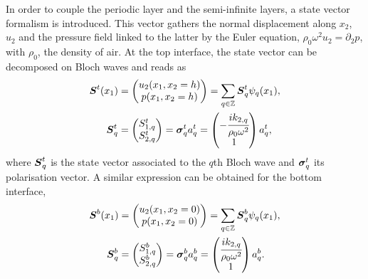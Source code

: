 In order to couple the periodic layer and the semi-infinite layers, a state vector formalism is introduced. This vector gathers  the normal displacement along $x_2$, $u_2$ and the pressure field linked to the latter by the Euler equation, $\rho_0\omega^2 u_2 = \partial_2 p$, with $\rho_0$, the density of air. At the top interface, the state vector can be decomposed on Bloch waves and reads as
\begin{equation}\label{eq:S^top}
    \begin{aligned}
        \boldsymbol S^t(x_1) &=
        \begin{pmatrix} u_2(x_1,x_2=h) \\ p(x_1,x_2=h) \end{pmatrix}
        = \sum_{q \in \mathbb Z} \boldsymbol S_q^t \psi_q(x_1), \\
        \boldsymbol S_q^t &= \begin{pmatrix}
            S_{1,q}^t \\ S_{2,q}^t
        \end{pmatrix} = \boldsymbol \sigma_q^t a_q^t = \begin{pmatrix} -\cfrac{ik_{2,q}}{\rho_0 \omega^2} \\ 1 \end{pmatrix} a_q^t,
    \end{aligned}
\end{equation}
where $\boldsymbol S_q^t$ is the state vector associated to the $q$th Bloch wave and $\boldsymbol \sigma_q^t $ its polarisation vector. A similar expression can be obtained for the bottom interface,
\begin{equation}\label{eq:S^bottom}
    \begin{aligned}
        \boldsymbol S^b(x_1) &=
        \begin{pmatrix} u_2(x_1,x_2=0) \\ p(x_1,x_2=0) \end{pmatrix}
        = \sum_{q \in \mathbb Z} \boldsymbol S_q^b \psi_q(x_1), \\
        \boldsymbol S_q^b &= \begin{pmatrix}
            S_{1,q}^b \\ S_{2,q}^b
        \end{pmatrix} = \boldsymbol \sigma_q^b a_q^b = \begin{pmatrix} \cfrac{ik_{2,q}}{\rho_0 \omega^2} \\ 1 \end{pmatrix} a_q^b.
    \end{aligned}
\end{equation}

